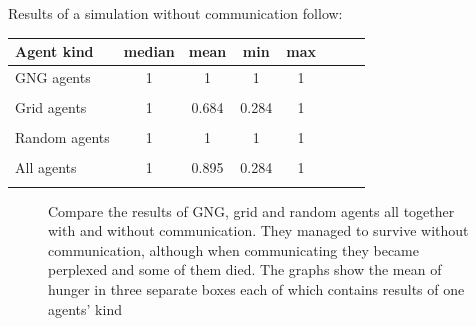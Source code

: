 Results of a simulation without communication follow:

\begin{center} 
  \begin{tabular}{l*{6}{c}r}
  Agent kind        & median & mean & min & max \\
  \hline
  GNG agents        & 1 & 1 & 1 & 1  \\
                    &   \\
  Grid agents       & 1                     & 0.684                 & 0.284                & 1  \\  
                    & \color{green}{+0.542}  & \color{green}{+0.062}  & \color{red}{-0.045}  \\
  Random agents     & 1 & 1 & 1 & 1  \\         
                    & \\
  All agents        & 1 & 0.895                 & 0.284 & 1  \\  
                    &   & \color{green}{+0.133}  & \color{red}{-0.036} \\
  \end{tabular}                                        
\end{center}



\begin{figure}[h!]
  \centering      
  \caption{Compare the results of GNG, grid and random agents all together with and without communication. They managed to survive without communication, although when communicating they became perplexed and some of them died. The graphs show the mean of hunger in three separate boxes each of which contains results of one agents' kind}
\end{figure} 
              
